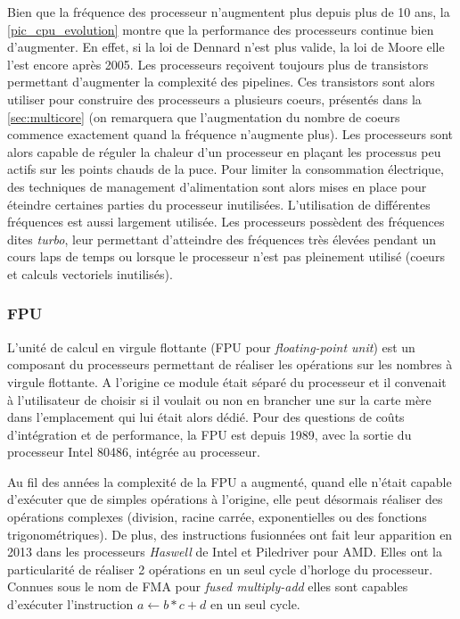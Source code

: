 Bien que la fréquence des processeur n'augmentent plus depuis plus de 10 ans, la \autoref{pic_cpu_evolution} montre que la performance des processeurs continue bien d'augmenter. En effet, si la loi de Dennard n'est plus valide, la loi de Moore elle l'est encore après 2005. Les processeurs reçoivent toujours plus de transistors permettant d'augmenter la complexité des pipelines. Ces transistors sont alors utiliser pour construire des processeurs a plusieurs coeurs, présentés dans la \autoref{sec:multicore} (on remarquera que l'augmentation du nombre de coeurs commence exactement quand la fréquence n'augmente plus). Les processeurs sont alors capable de réguler la chaleur d'un processeur en plaçant les processus peu actifs sur les points chauds de la puce.
Pour limiter la consommation électrique, des techniques de management d'alimentation sont alors mises en place pour éteindre certaines parties du processeur inutilisées.
L'utilisation de différentes fréquences est aussi largement utilisée. Les processeurs possèdent des fréquences dites \textit{turbo}, leur permettant d'atteindre des fréquences très élevées pendant un cours laps de temps ou lorsque le processeur n'est pas pleinement utilisé (coeurs et calculs vectoriels inutilisés).



\subsubsection{FPU}\label{sec:fpu}


L'unité de calcul en virgule flottante (FPU pour \textit{floating-point  unit}) est un composant du processeurs permettant de réaliser les opérations sur les nombres à virgule flottante. A l'origine ce module était séparé du processeur et il convenait à l'utilisateur de choisir si il voulait ou non en brancher une sur la carte mère dans l'emplacement qui lui était alors dédié. Pour des questions de coûts d'intégration et de performance, la FPU est depuis 1989, avec la sortie du processeur Intel 80486,  intégrée au processeur. 

Au fil des années la complexité de la FPU a augmenté, quand elle n'était capable d'exécuter que de simples opérations à l'origine, elle peut désormais réaliser des opérations complexes (division, racine carrée, exponentielles ou des fonctions trigonométriques).  De plus, des instructions fusionnées ont fait leur apparition en 2013 dans les processeurs \textit{Haswell} de Intel et Piledriver pour AMD. Elles ont la particularité de réaliser 2 opérations en un seul cycle d'horloge du processeur. Connues sous le nom de FMA pour \textit{fused multiply-add} elles sont capables d'exécuter l'instruction $a \leftarrow b * c + d$ en un seul cycle. 

